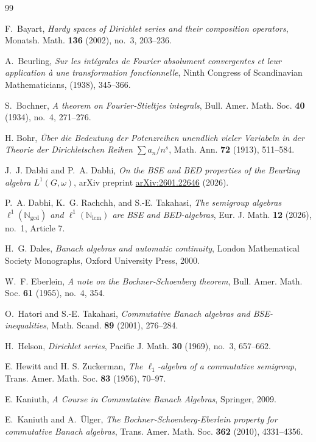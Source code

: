 \documentclass{amsart}
\theoremstyle{definition}
\theoremstyle{remark}
\numberwithin{equation}{section}
\begin{document}
\begin{thebibliography}{99}

F.~Bayart,
\emph{Hardy spaces of Dirichlet series and their composition operators},
Monatsh. Math. \textbf{136} (2002), no.~3, 203--236.

A.~Beurling,
\emph{Sur les int\'{e}grales de Fourier absolument convergentes et leur application \`{a} une transformation fonctionnelle},
Ninth Congress of Scandinavian Mathematicians, (1938), 345--366.

S.~Bochner,
\emph{A theorem on Fourier-Stieltjes integrals},
Bull. Amer. Math. Soc. \textbf{40} (1934), no.~4, 271--276.

 H. Bohr, \emph{\"Uber die Bedeutung der Potenzreihen unendlich vieler Variabeln in der Theorie der Dirichletschen Reihen $\sum a_n/n^s$}, Math. Ann. \textbf{72} (1913), 511--584.

J.~J. Dabhi and P.~A. Dabhi,
\emph{On the BSE and BED properties of the Beurling algebra $L^1(G,\omega)$},
arXiv preprint \href{https://arxiv.org/abs/2601.22646}{arXiv:2601.22646} (2026).

P.~A. Dabhi, K.~G. Rachchh, and S.-E. Takahasi,
\emph{The semigroup algebras $\ell^1(\mathbb N_{\gcd})$ and $\ell^1(\mathbb N_{\operatorname{lcm}})$ are BSE and BED-algebras},
Eur. J. Math. \textbf{12} (2026), no.~1, Article 7.

H.~G. Dales,
\emph{Banach algebras and automatic continuity},
London Mathematical Society Monographs, Oxford University Press, 2000.

W.~F. Eberlein,
\emph{A note on the Bochner-Schoenberg theorem},
Bull. Amer. Math. Soc. \textbf{61} (1955), no.~4, 354.

O.~Hatori and S.-E. Takahasi,
\emph{Commutative Banach algebras and BSE-inequalities},
Math. Scand. \textbf{89} (2001), 276--284.

H.~Helson,
\emph{Dirichlet series},
Pacific J. Math. \textbf{30} (1969), no.~3, 657--662.

 E. Hewitt and H. S. Zuckerman, \emph{The $\ell_1$-algebra of a commutative semigroup}, Trans. Amer. Math. Soc. \textbf{83} (1956), 70--97.

 E. Kaniuth, \emph{A Course in Commutative Banach Algebras}, Springer, 2009.

E.~Kaniuth and A.~\"{U}lger,
\emph{The Bochner-Schoenberg-Eberlein property for commutative Banach algebras},
Trans. Amer. Math. Soc. \textbf{362} (2010), 4331--4356.


\end{thebibliography}
\end{document}
